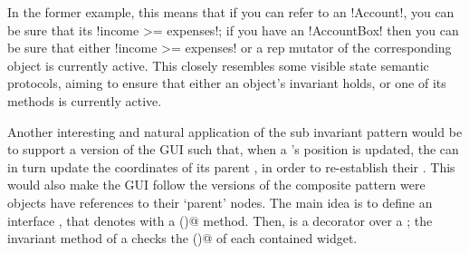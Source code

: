 In the former example, this means that
if you can refer to an \Q!Account!, you can be sure that its \Q!income >= expenses!;
if you have an \Q!AccountBox! then you can be sure that either \Q!income >= expenses! or 
a rep mutator of the corresponding \Q@Account@ object is currently active.
This closely resembles some visible state semantic protocols, aiming to ensure that  
either an object's invariant holds, or one of its methods is currently active.


Another interesting and natural application of the sub invariant pattern would be to support a version of the GUI such that, when a \Q@Widget@'s position is updated, the \Q@Widget@ can in turn update the coordinates of its parent \Q@Widget@s, in order to re-establish their \Q@subInvariants@.
This would also make the GUI follow the versions of the composite pattern were objects have references to their `parent' nodes.
The main idea is to define an interface \Q@HasSubInvariant@, that denotes \Q@Widgets@ with a \Q@subInvariant()@ method. Then, \Q@WidgetWithInvariant@ is a decorator over a \Q@Widget@; the invariant method of a \Q@WidgetWithInvariant@ checks the \Q@subInvariant()@ of each contained widget.


